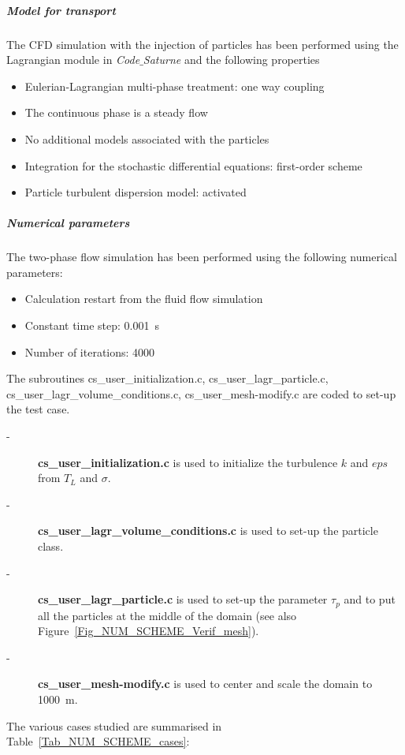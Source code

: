 \subparagraph{Model for transport} The CFD simulation with the injection of particles has been performed using the Lagrangian module in \textit{Code$\_$Saturne} and the following properties
\begin{itemize}
 \item Eulerian-Lagrangian multi-phase treatment: one way coupling
 \item The continuous phase is a steady flow
 \item No additional models associated with the particles
 \item Integration for the stochastic differential equations: first-order scheme
 \item Particle turbulent dispersion model: activated
\end{itemize}
\subparagraph{Numerical parameters} The two-phase flow simulation has been performed using the following numerical parameters:
\begin{itemize}
 \item Calculation restart from the fluid flow simulation
 \item Constant time step: \SI{0.001}{s}
 \item Number of iterations: \SI{4000}{}
\end{itemize}

The subroutines cs\_user\_initialization.c, cs\_user\_lagr\_particle.c, cs\_user\_lagr\_volume\_conditions.c, cs\_user\_mesh-modify.c are coded to set-up the test case.

\begin{description}

   \item[-] \textbf{cs\_user\_initialization.c} is used to initialize the turbulence $k$ and $eps$ from $T_L$ and $\sigma$.
   \item[-] \textbf{cs\_user\_lagr\_volume\_conditions.c} is used to set-up the particle class.
   \item[-] \textbf{cs\_user\_lagr\_particle.c} is used to set-up the parameter $\tau_p$ and to put all the particles at the middle of the domain (see also Figure~\ref{Fig_NUM_SCHEME_Verif_mesh}).
   \item[-] \textbf{cs\_user\_mesh-modify.c} is used to center and scale the domain to \SI{1000}{m}.

\end{description}

The various cases studied are summarised in Table~\ref{Tab_NUM_SCHEME_cases}:

